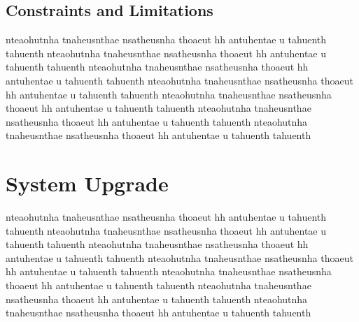\subsection{Constraints and Limitations}
nteaohutnha tnaheusnthae nsatheusnha thoaeut hh antuhentae u tahuenth tahuenth
nteaohutnha tnaheusnthae nsatheusnha thoaeut hh antuhentae u tahuenth tahuenth
nteaohutnha tnaheusnthae nsatheusnha thoaeut hh antuhentae u tahuenth tahuenth
nteaohutnha tnaheusnthae nsatheusnha thoaeut hh antuhentae u tahuenth tahuenth
nteaohutnha tnaheusnthae nsatheusnha thoaeut hh antuhentae u tahuenth tahuenth
nteaohutnha tnaheusnthae nsatheusnha thoaeut hh antuhentae u tahuenth tahuenth
nteaohutnha tnaheusnthae nsatheusnha thoaeut hh antuhentae u tahuenth tahuenth

\section{System Upgrade}
nteaohutnha tnaheusnthae nsatheusnha thoaeut hh antuhentae u tahuenth tahuenth
nteaohutnha tnaheusnthae nsatheusnha thoaeut hh antuhentae u tahuenth tahuenth
nteaohutnha tnaheusnthae nsatheusnha thoaeut hh antuhentae u tahuenth tahuenth
nteaohutnha tnaheusnthae nsatheusnha thoaeut hh antuhentae u tahuenth tahuenth
nteaohutnha tnaheusnthae nsatheusnha thoaeut hh antuhentae u tahuenth tahuenth
nteaohutnha tnaheusnthae nsatheusnha thoaeut hh antuhentae u tahuenth tahuenth
nteaohutnha tnaheusnthae nsatheusnha thoaeut hh antuhentae u tahuenth tahuenth



